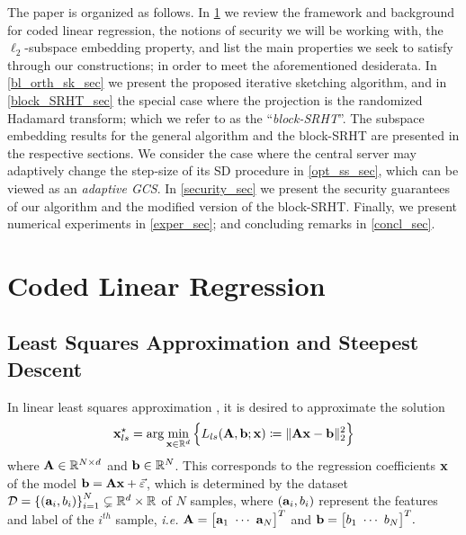 \documentclass[journal,letterpaper,onecolumn,twoside,nofonttune]{IEEEtran}
\newcommand{\xb}{\bold{x}}
\newcommand{\D}{\mathcal{D}}
\newcommand{\R}{\mathbb{R}}
\newcommand{\Ab}{\bold{A}}
\newcommand{\bb}{\bold{b}}
\newcommand{\ab}{\bold{a}}
\begin{document}
The paper is organized as follows. In \ref{coded_LR} we review the framework and background for coded linear regression, the notions of security we will be working with, the $\ell_2$-subspace embedding property, and list the main properties we seek to satisfy through our constructions; in order to meet the aforementioned desiderata. In \ref{bl_orth_sk_sec} we present the proposed iterative sketching algorithm, and in \ref{block_SRHT_sec} the special case where the projection is the randomized Hadamard transform; which we refer to as the ``\textit{block-SRHT}''. The subspace embedding results for the general algorithm and the block-SRHT are presented in the respective sections. We consider the case where the central server may adaptively change the step-size of its SD procedure in \ref{opt_ss_sec}, which can be viewed as an \textit{adaptive GCS}. In \ref{security_sec} we present the security guarantees of our algorithm and the modified version of the block-SRHT. Finally, we present numerical experiments in \ref{exper_sec}; and concluding remarks in \ref{concl_sec}.

\section{Coded Linear Regression}
\label{coded_LR}

\subsection{Least Squares Approximation and Steepest Descent}
\label{LR_SD}

In linear least squares approximation \cite{DMMS11}, it is desired to approximate the solution
\begin{equation}
\label{x_star_pr_lr}
  \xb_{ls}^{\star} = \arg\min_{\xb\in\R^d}\Big\{L_{ls}(\Ab,\bb;\xb)\coloneqq\|\Ab\xb-\bb\|_2^2\Big\}
\end{equation}
where $\Ab\in\R^{N\times d}$ and $\bb\in\R^N$. This corresponds to the regression coefficients $\xb$ of the model $\bb=\Ab\xb+\vec{\varepsilon}$, which is determined by the dataset $\D=\left\{(\ab_i,b_i)\right\}_{i=1}^N\subsetneq \R^d\times\R$ of $N$ samples, where $(\ab_i,b_i)$ represent the features and label of the $i^{th}$ sample, \textit{i.e.} $\Ab=\big[\ab_1 \ \cdots \ \ab_N \big]^T$ and $\bb=\big[b_1 \ \cdots \ b_N \big]^T.$
\end{document}
